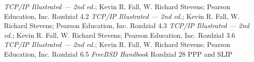 \begin{thebibliography}{99}
        \emph{TCP/IP Illustrated --- 2nd ed.}; Kevin R. Fall, W. Richard Stevens; Pearson Education, Inc.
        Rozdział 4.2
        \emph{TCP/IP Illustrated --- 2nd ed.}; Kevin R. Fall, W. Richard Stevens; Pearson Education, Inc.
        Rozdział 4.3
        \emph{TCP/IP Illustrated --- 2nd ed.}; Kevin R. Fall, W. Richard Stevens; Pearson Education, Inc.
        Rozdział 3.6
        \emph{TCP/IP Illustrated --- 2nd ed.}; Kevin R. Fall, W. Richard Stevens; Pearson Education, Inc.
        Rozdział 6.5
        \emph{FreeBSD Handbook}
        Rozdział 28 PPP and SLIP
\end{thebibliography}
